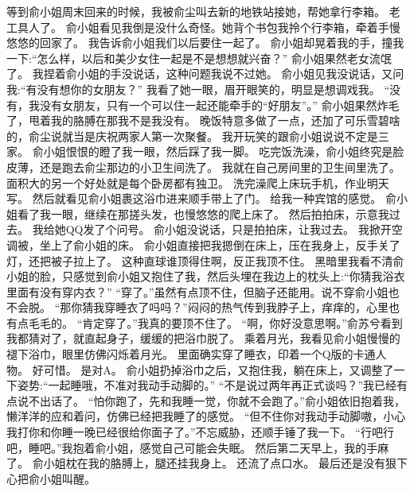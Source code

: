 等到俞小姐周末回来的时候，我被俞尘叫去新的地铁站接她，帮她拿行李箱。
老工具人了。
俞小姐看见我倒是没什么奇怪。她背个书包我拎个行李箱，牵着手慢悠悠的回家了。
我告诉俞小姐我们以后要住一起了。
俞小姐却晃着我的手，撞我一下:“怎么样，以后和美少女住一起是不是想想就兴奋？”
俞小姐果然老女流氓了。
我捏着俞小姐的手没说话，这种问题我说不过她。
俞小姐见我没说话，又问我:“有没有想你的女朋友？”
我看了她一眼，眉开眼笑的，明显是想调戏我。
“没有，我没有女朋友，只有一个可以住一起还能牵手的“好朋友”。”
俞小姐果然炸毛了，甩着我的胳膊在那我不是我没有。
晚饭特意多做了一点，还加了可乐雪碧啥的，俞尘说就当是庆祝两家人第一次聚餐。
我开玩笑的跟俞小姐说说不定是三家。 俞小姐恨恨的瞪了我一眼，然后踩了我一脚。
吃完饭洗澡，俞小姐终究是脸皮薄，还是跑去俞尘那边的小卫生间洗了。 我就在自己房间里的卫生间里洗了。
面积大的另一个好处就是每个卧房都有独卫。
洗完澡爬上床玩手机，作业明天写。
然后就看见俞小姐裹这浴巾进来顺手带上了门。
给我一种宾馆的感觉。
俞小姐看了我一眼，继续在那搓头发，也慢悠悠的爬上床了。
然后拍拍床，示意我过去。
我给她QQ发了个问号。
俞小姐没说话，只是拍拍床，让我过去。
我掀开空调被，坐上了俞小姐的床。
俞小姐直接把我摁倒在床上，压在我身上，反手关了灯，还把被子拉上了。
这种直球谁顶得住啊，反正我顶不住。
黑暗里我看不清俞小姐的脸，只感觉到俞小姐又抱住了我，然后头埋在我边上的枕头上:“你猜我浴衣里面有没有穿内衣？”
“穿了。”虽然有点顶不住，但脑子还能用。说不穿俞小姐也不会脱。
“那你猜我穿睡衣了吗吗？”闷闷的热气传到我脖子上，痒痒的，心里也有点毛毛的。
“肯定穿了。”我真的要顶不住了。
“啊，你好没意思啊。”俞苏兮看到我都猜对了，就直起身子，缓缓的把浴巾脱了。
乘着月光，我看见俞小姐慢慢的褪下浴巾，眼里仿佛闪烁着月光。
里面确实穿了睡衣，印着一个Q版的卡通人物。
好可惜。
是对A。
俞小姐扔掉浴巾之后，又抱住我，躺在床上，又调整了一下姿势:“一起睡哦，不准对我动手动脚的。”
“不是说过两年再正式谈吗？”我已经有点说不出话了。
“怕你跑了，先和我睡一觉，你就不会跑了。”俞小姐依旧抱着我，懒洋洋的应和着问，仿佛已经把我睡了的感觉。
“但不住你对我动手动脚嗷，小心我打你和你睡一晚已经很给你面子了。”不忘威胁，还顺手锤了我一下。
“行吧行吧，睡吧。”我抱着俞小姐，感觉自己可能会失眠。
然后第二天早上，我的手麻了。
俞小姐枕在我的胳膊上，腿还挂我身上。
还流了点口水。
最后还是没有狠下心把俞小姐叫醒。

